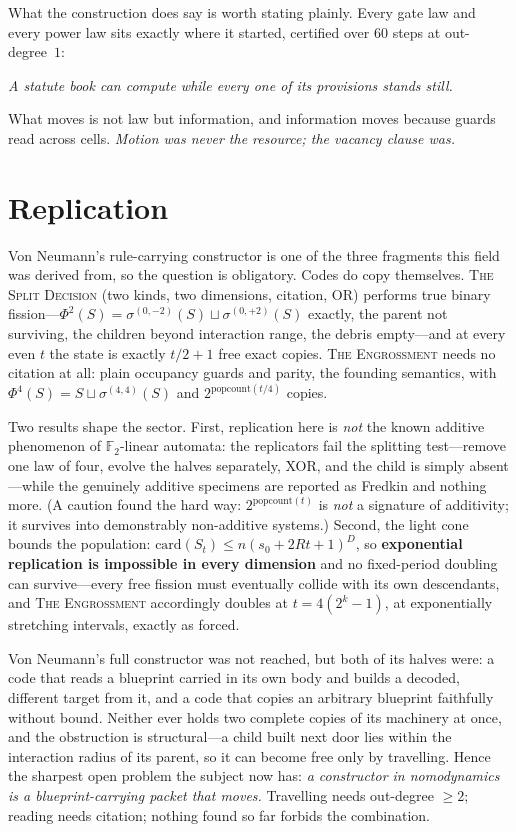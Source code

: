 \documentclass[10pt]{article}
\theoremstyle{definition}
\theoremstyle{remark}
\begin{document}
What the construction does say is worth stating plainly. Every gate law and
every power law sits exactly where it started, certified over $60$ steps at
out-degree~$1$:
\begin{center}
\emph{A statute book can compute while every one of its provisions stands
still.}
\end{center}
\noindent What moves is not law but information, and information moves because
guards read across cells. \emph{Motion was never the resource; the vacancy
clause was.}

\section{Replication}
Von Neumann's rule-carrying constructor is one of the three fragments this
field was derived from, so the question is obligatory. Codes do copy
themselves. \textsc{The Split Decision} (two kinds, two dimensions, citation,
OR) performs true binary fission---$\Phi^2(S)=\sigma^{(0,-2)}(S)\sqcup
\sigma^{(0,+2)}(S)$ exactly, the parent not surviving, the children beyond
interaction range, the debris empty---and at every even $t$ the state is
exactly $t/2+1$ free exact copies. \textsc{The Engrossment} needs no citation
at all: plain occupancy guards and parity, the founding semantics, with
$\Phi^4(S)=S\sqcup\sigma^{(4,4)}(S)$ and $2^{\mathrm{popcount}(t/4)}$ copies.

Two results shape the sector. First, replication here is \emph{not} the known
additive phenomenon of $\mathbb{F}_2$-linear automata: the replicators fail the
splitting test---remove one law of four, evolve the halves separately, XOR, and
the child is simply absent---while the genuinely additive specimens are
reported as Fredkin and nothing more. (A caution found the hard way:
$2^{\mathrm{popcount}(t)}$ is \emph{not} a signature of additivity; it survives
into demonstrably non-additive systems.) Second, the light cone bounds the
population: $\mathrm{card}(S_t)\le n(s_0+2Rt+1)^D$, so \textbf{exponential
replication is impossible in every dimension} and no fixed-period doubling can
survive---every free fission must eventually collide with its own descendants,
and \textsc{The Engrossment} accordingly doubles at $t=4(2^k-1)$, at
exponentially stretching intervals, exactly as forced.

Von Neumann's full constructor was not reached, but both of its halves were: a
code that reads a blueprint carried in its own body and builds a decoded,
different target from it, and a code that copies an arbitrary blueprint
faithfully without bound. Neither ever holds two complete copies of its
machinery at once, and the obstruction is structural---a child built next door
lies within the interaction radius of its parent, so it can become free only by
travelling. Hence the sharpest open problem the subject now has: \emph{a
constructor in nomodynamics is a blueprint-carrying packet that moves.}
Travelling needs out-degree $\ge2$; reading needs citation; nothing found so
far forbids the combination.
\end{document}
